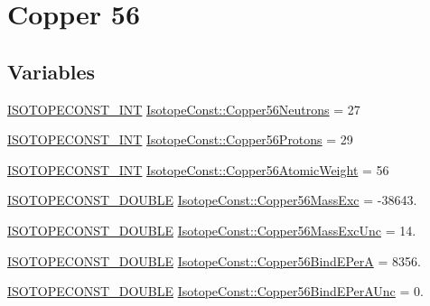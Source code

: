 \hypertarget{group___isotope_const-_copper-_cu56}{}\section{Copper 56}
\label{group___isotope_const-_copper-_cu56}
\subsection*{Variables}
\begin{DoxyCompactItemize}
\item 
\mbox{\hyperlink{group___isotope_const-_macros_ga5f18360b3e99483a35c32d789e62621c}{I\+S\+O\+T\+O\+P\+E\+C\+O\+N\+S\+T\+\_\+\+I\+NT}} \mbox{\hyperlink{group___isotope_const-_copper-_cu56_gaa6ebeeeeae8e2ee9d04ce624d8af5e45}{Isotope\+Const\+::\+Copper56\+Neutrons}} = 27
\item 
\mbox{\hyperlink{group___isotope_const-_macros_ga5f18360b3e99483a35c32d789e62621c}{I\+S\+O\+T\+O\+P\+E\+C\+O\+N\+S\+T\+\_\+\+I\+NT}} \mbox{\hyperlink{group___isotope_const-_copper-_cu56_gaff6b190a9ff824d1b5dc349e4baef29e}{Isotope\+Const\+::\+Copper56\+Protons}} = 29
\item 
\mbox{\hyperlink{group___isotope_const-_macros_ga5f18360b3e99483a35c32d789e62621c}{I\+S\+O\+T\+O\+P\+E\+C\+O\+N\+S\+T\+\_\+\+I\+NT}} \mbox{\hyperlink{group___isotope_const-_copper-_cu56_gaf27ef58a336a7a7571889d3baedc8aac}{Isotope\+Const\+::\+Copper56\+Atomic\+Weight}} = 56
\item 
\mbox{\hyperlink{group___isotope_const-_macros_ga8f45a7272ce02c0b4c65c44636ed719a}{I\+S\+O\+T\+O\+P\+E\+C\+O\+N\+S\+T\+\_\+\+D\+O\+U\+B\+LE}} \mbox{\hyperlink{group___isotope_const-_copper-_cu56_gae509dba34f013326dfed86730a892e3e}{Isotope\+Const\+::\+Copper56\+Mass\+Exc}} = -\/38643.
\item 
\mbox{\hyperlink{group___isotope_const-_macros_ga8f45a7272ce02c0b4c65c44636ed719a}{I\+S\+O\+T\+O\+P\+E\+C\+O\+N\+S\+T\+\_\+\+D\+O\+U\+B\+LE}} \mbox{\hyperlink{group___isotope_const-_copper-_cu56_ga6c6ff7ced54857455b6f19650ec71af0}{Isotope\+Const\+::\+Copper56\+Mass\+Exc\+Unc}} = 14.
\item 
\mbox{\hyperlink{group___isotope_const-_macros_ga8f45a7272ce02c0b4c65c44636ed719a}{I\+S\+O\+T\+O\+P\+E\+C\+O\+N\+S\+T\+\_\+\+D\+O\+U\+B\+LE}} \mbox{\hyperlink{group___isotope_const-_copper-_cu56_ga2acc7cd3d03ce4e660210ed96e9248cf}{Isotope\+Const\+::\+Copper56\+Bind\+E\+PerA}} = 8356.
\item 
\mbox{\hyperlink{group___isotope_const-_macros_ga8f45a7272ce02c0b4c65c44636ed719a}{I\+S\+O\+T\+O\+P\+E\+C\+O\+N\+S\+T\+\_\+\+D\+O\+U\+B\+LE}} \mbox{\hyperlink{group___isotope_const-_copper-_cu56_ga7c985a56af44c5d72c16d547d6cdd491}{Isotope\+Const\+::\+Copper56\+Bind\+E\+Per\+A\+Unc}} = 0.

\end{DoxyCompactItemize}
